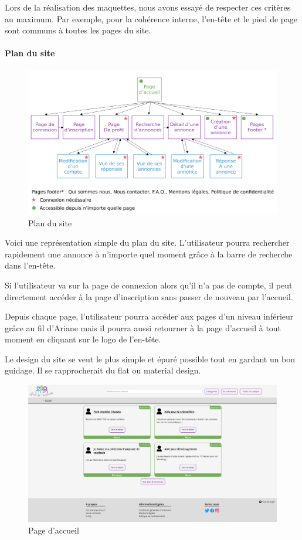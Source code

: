 \documentclass[a4paper,11pt]{article}
\begin{document}
Lors de la réalisation des maquettes, nous avons essayé de respecter ces critères au maximum.
Par exemple, pour la cohérence interne, l’en-tête et le pied de page sont communs à toutes les pages du site.

\paragraph{Plan du site}

\begin{figure}[H]
  \includegraphics[width=\linewidth]{../Conception/plan-du-site.png}
  \caption{Plan du site}
  \label{fig:plan-du-site}
\end{figure}

Voici une représentation simple du plan du site. L'utilisateur pourra rechercher rapidement une annonce
à n'importe quel moment grâce à la barre de recherche dans l'en-tête.

Si l'utilisateur va sur la page de connexion alors qu'il n'a pas de compte, il peut directement
accéder à la page d'inscription sans passer de nouveau par l'accueil.

Depuis chaque page, l'utilisateur pourra accéder aux pages d'un niveau inférieur grâce au fil d'Ariane
mais il pourra aussi retourner à la page d'accueil à tout moment en cliquant sur le logo de l'en-tête.

Le design du site se veut le plus simple et épuré possible tout en gardant un bon guidage. Il se
rapprocherait du flat ou material design.

\begin{figure}[H]
  \includegraphics[width=\linewidth]{images/page-accueil.png}
  \caption{Page d'accueil}
  \label{fig:page-accueil}
\end{figure}
\end{document}
